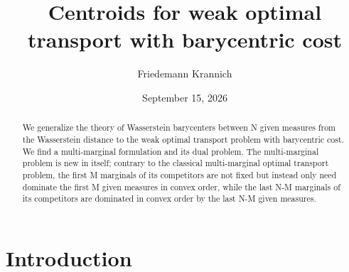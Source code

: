 \documentclass[letterpaper]{amsart}
\title[Centroids for weak optimal transport]{Centroids for weak optimal transport with barycentric cost}
\author{Friedemann Krannich}
\date{September 15, 2026}
\theoremstyle{definition}
\begin{document}
	
\begin{abstract} 
	We generalize the theory of Wasserstein barycenters between N given measures from the Wasserstein distance to the weak optimal transport problem with barycentric cost. We find a multi-marginal formulation and its dual problem. The multi-marginal problem is new in itself; contrary to the classical multi-marginal optimal transport problem, the first M marginals of its competitors are not fixed but instead only need dominate the first M given measures in convex order, while the last N-M marginals of its competitors are dominated in convex order by the last N-M given measures. 
\end{abstract}


\maketitle

\section{Introduction}
\end{document}

